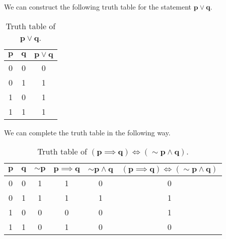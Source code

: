 %
%

\begin{subquestions}


\subquestion

\begin{subsubquestions}
	
\subsubquestion

We can construct the following truth table for the statement $\boldsymbol{p \lor q}$.
\begin{table}[ht]
	\centering
	\begin{tabular}{|c|c|c|}
		\hline
		$\boldsymbol{p}$ & $\boldsymbol{q}$ & $\boldsymbol{p \lor q}$ \\
		\hline
		0 & 0 & 0 \\
		0 & 1 & 1 \\
		1 & 0 & 1 \\
		1 & 1 & 1 \\
		\hline
	\end{tabular}
	\caption{\label{2005:q1:tab:TruthTab1} Truth table of $\boldsymbol{p \lor q}$.}
\end{table}


\subsubquestion

We can complete the truth table in the following way.
\begin{table}[ht]
	\centering
	\begin{tabular}{|c|c|c|c|c|c|}
		\hline
		$\boldsymbol{p}$ & $\boldsymbol{q}$ & $\boldsymbol{\sim p}$ & $\boldsymbol{p \implies q}$ & $\boldsymbol{\sim p \land q}$ & $\boldsymbol{(p \implies q) \iff (\sim p \land q)}$ \\
		\hline
		0 & 0 & 1 & 1 & 0 & 0 \\
		0 & 1 & 1 & 1 & 1 & 1 \\
		1 & 0 & 0 & 0 & 0 & 1 \\
		1 & 1 & 0 & 1 & 0 & 0 \\
		\hline
	\end{tabular}
	\caption{\label{2005:q1:tab:TruthTab2} Truth table of $\boldsymbol{(p \implies q) \iff (\sim p \land q)}$.}
\end{table}


\end{subsubquestions}
\end{subquestions}
